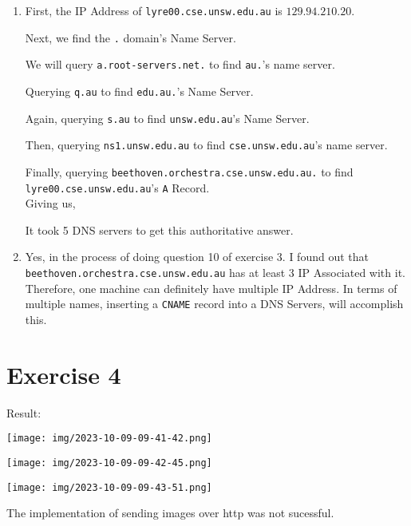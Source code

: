 \documentclass[12pt]{article}
\newcommand{\lil}[1]{\lstinline{#1}}
\begin{document}
\begin{enumerate}
    \item First, the IP Address of \lil{lyre00.cse.unsw.edu.au} is 
        $129.94.210.20$. 
        
        Next, we find the \lil{.} domain's Name Server. 
        
        We will query \lil{a.root-servers.net.} to find \lil{au.}'s name server.
        
        Querying \lil{q.au} to find \lil{edu.au.}'s Name Server.
        
        Again, querying \lil{s.au} to find \lil{unsw.edu.au}'s Name Server.
        
        Then, querying \lil{ns1.unsw.edu.au} to find \lil{cse.unsw.edu.au}'s 
        name server.
        
        Finally, querying \lil{beethoven.orchestra.cse.unsw.edu.au.}
        to find \lil{lyre00.cse.unsw.edu.au}'s \lil{A} Record.\\ 
        Giving us, 
        

        It took 5 DNS servers to get this authoritative answer.

    \item Yes, in the process of doing question 10 of exercise 3.
      I found out that \lil{beethoven.orchestra.cse.unsw.edu.au} has 
      at least 3 IP Associated with it. Therefore, one machine can definitely
      have multiple IP Address. In terms of multiple names, inserting a 
      \lil{CNAME} record into a DNS Servers, will accomplish this.
      
\end{enumerate}

\newpage

\section*{Exercise 4}
Result:
\begin{center}
    \texttt{[image: img/2023-10-09-09-41-42.png]}\\
    \caption{}
\end{center}
\begin{center}
    \texttt{[image: img/2023-10-09-09-42-45.png]}\\
  \caption{}
\end{center}
\begin{center}
    \texttt{[image: img/2023-10-09-09-43-51.png]}\\
  \caption{}
\end{center}
The implementation of sending images over http was not sucessful.
\end{document}
